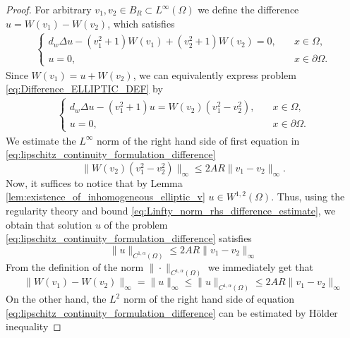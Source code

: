 \documentclass[11pt, a4paper]{article}
\theoremstyle{break}
\theoremstyle{break}
\theoremstyle{break}
\theoremstyle{break}
\theoremstyle{break}
\theoremstyle{break}
\theoremstyle{break}
\begin{document}
\begin{proof}
    For arbitrary $v_1, v_2 \in B_R \subset L^\infty(\Omega)$ we define the difference $u = W(v_1) - W(v_2)$, which satisfies
    \begin{align}
        \label{eq:Difference_ELLIPTIC_DEF}
        \begin{cases}
            d_w\Delta u - (v_1^2 + 1) W(v_1) + (v_2^2 + 1) W(v_2) = 0, &\quad x \in \Omega, \\
            u = 0, &\quad x \in \partial\Omega.
        \end{cases}
    \end{align}
    Since $W(v_1) = u + W(v_2)$, we can equivalently express problem \eqref{eq:Difference_ELLIPTIC_DEF} by
    \begin{align}
        \label{eq:lipschitz_continuity_formulation_difference}
        \begin{cases}
            d_w\Delta u - (v_1^2 + 1) u  = W(v_2) (v_1^2 - v_2^2), &\quad x \in \Omega, \\
            u = 0, &\quad x \in \partial\Omega.
        \end{cases}
    \end{align}
    We estimate the $L^\infty$ norm of the right hand side of first equation in  \eqref{eq:lipschitz_continuity_formulation_difference}
    \begin{equation}
        \label{eq:Linfty_norm_rhs_difference_estimate}
        \|W(v_2) (v_1^2-v_2^2)\|_\infty \leq 2AR\|v_1-v_2\|_\infty.
    \end{equation}
    Now, it suffices to notice that by Lemma \ref{lem:existence_of_inhomogeneous_elliptic_v} $u \in W^{1,2}(\Omega)$. Thus, using the regularity theory \cite[Theorem 8.34]{gilbarg2001elliptic} and bound \eqref{eq:Linfty_norm_rhs_difference_estimate}, we obtain that solution $u$ of the problem \eqref{eq:lipschitz_continuity_formulation_difference} satisfies
    \begin{equation}
        \|u\|_{C^{1, \alpha}(\Omega)}  \leq 2AR\|v_1-v_2\|_\infty
    \end{equation}
    From the definition of the norm $\|\cdot\|_{C^{1,\alpha}(\Omega)}$ we immediately get that
    \begin{equation}
        \|W(v_1) - W(v_2)\|_\infty = \|u\|_\infty \leq \|u\|_{C^{1, \alpha}(\Omega)}  \leq 2AR\|v_1-v_2\|_\infty
    \end{equation}
    On the other hand, the $L^2$ norm of the right hand side of equation \eqref{eq:lipschitz_continuity_formulation_difference} can be estimated by H\"older inequality

\end{proof}
\end{document}
